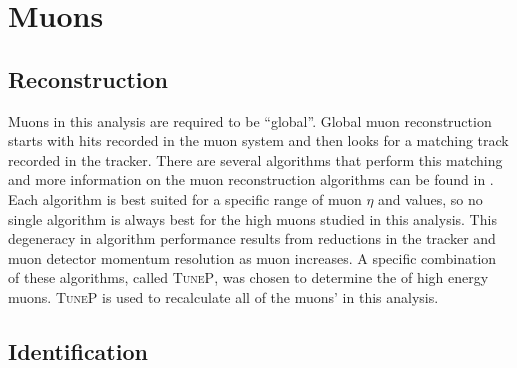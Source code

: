 \section{Muons}

\subsection{Reconstruction}
Muons in this analysis are required to be ``global''. Global muon reconstruction starts with hits recorded in the muon system and then looks for a matching track recorded in the tracker. There are several algorithms that perform this matching and more information on the muon reconstruction algorithms can be found in \cite{CMS-MUO-16-001}. Each algorithm is best suited for a specific range of muon $\eta$ and \pt values, so no single algorithm is always best for the high \pt muons studied in this analysis. This degeneracy in algorithm performance results from reductions in the tracker and muon detector momentum resolution as muon \pt increases. A specific combination of these algorithms, called \textsc{TuneP}, was chosen to determine the \pt of high energy muons. \textsc{TuneP} is used to recalculate all of the muons' \pt in this analysis.

\subsection{Identification}

